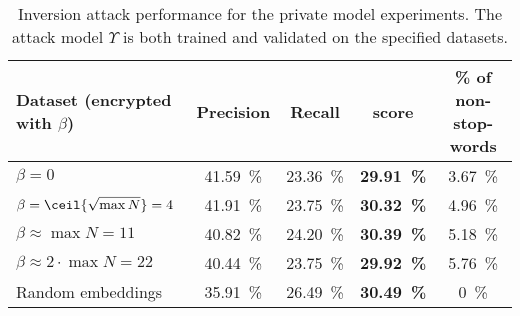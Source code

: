 {
	\def\arraystretch{1.2}
	\begin{table}[!ht]
		\begin{tabular*}{\linewidth}{ !{\extracolsep\fill} l c c >{\bfseries}c c } %
			\toprule
				Dataset (encrypted with $\beta$)	& Precision				& Recall				& \FOne{} score 		& \% of non-stop-words	\\
			\midrule
				$\beta = 0$							& \SI{41.59}{\percent}	& \SI{23.36}{\percent}	& \SI{29.91}{\percent}	& \SI{3.67}{\percent}	\\
				$\beta = \ceil{\sqrt{\max N}} = 4$	& \SI{41.91}{\percent}	& \SI{23.75}{\percent}	& \SI{30.32}{\percent}	& \SI{4.96}{\percent}	\\
				$\beta \approx \max N = 11$			& \SI{40.82}{\percent} 	& \SI{24.20}{\percent} 	& \SI{30.39}{\percent}	& \SI{5.18}{\percent}	\\
				$\beta \approx 2 \cdot \max N = 22$	& \SI{40.44}{\percent} 	& \SI{23.75}{\percent} 	& \SI{29.92}{\percent}	& \SI{5.76}{\percent}	\\
			\midrule
				Random embeddings					& \SI{35.91}{\percent}	& \SI{26.49}{\percent}	& \SI{30.49}{\percent}	& \SI{0}{\percent}		\\
			\bottomrule
		\end{tabular*}
		\caption[Inversion attack performance for the private model experiments]{
			Inversion attack performance for the private model experiments.
			The attack model $\Upsilon$ is both trained and validated on the specified datasets.
		}%
		\label{table:knn-private}
	\end{table}
}
